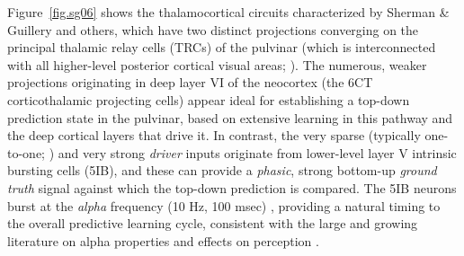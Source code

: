 \documentclass[12pt,twoside,lineno]{pnas-new}  %
\begin{document}
Figure~\ref{fig.sg06} shows the thalamocortical circuits characterized by Sherman \& Guillery \cite{ShermanGuillery06} and others, which have two distinct projections converging on the principal thalamic relay cells (TRCs) of the pulvinar (which is interconnected with all higher-level posterior cortical visual areas; \cite{Shipp03}).  The numerous, weaker projections originating in deep layer VI of the neocortex (the 6CT corticothalamic projecting cells) appear ideal for establishing a top-down prediction state in the pulvinar, based on extensive learning in this pathway and the deep cortical layers that drive it.  In contrast, the very sparse (typically one-to-one; \cite{Rockland98a,Rockland96}) and very strong {\em driver} inputs originate from lower-level layer V intrinsic bursting cells (5IB), and these can provide a {\em phasic}, strong bottom-up {\em ground truth} signal against which the top-down prediction is compared.  The 5IB neurons burst at the {\em alpha} frequency (10 Hz, 100 msec) \cite{LorinczKekesiJuhaszEtAl09,FranceschettiGuatteoPanzicaEtAl95,SaalmannPinskWangEtAl12}, providing a natural timing to the overall predictive learning cycle, consistent with the large and growing literature on alpha properties and effects on perception \cite{BuffaloFriesLandmanEtAl11,VanRullenKoch03,JensenBonnefondVanRullen12,FiebelkornKastner19}.
\end{document}
